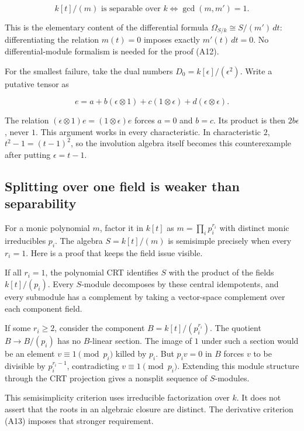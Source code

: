 \documentclass[
  11pt,
]{article}
\begin{document}
\[
\boxed{\ k[t]/(m)\text{ is separable over }k
       \iff \gcd(m,m')=1.\ }                       \tag{A13}
\]

This is the elementary content of the differential formula
\(\Omega_{S/k}\cong S/(m')\,dt\): differentiating the relation
\(m(t)=0\) imposes exactly \(m'(t)\,dt=0\). No differential-module
formalism is needed for the proof (A12).

For the smallest failure, take the dual numbers
\(D_0=k[\epsilon]/(\epsilon^2)\). Write a putative tensor as

\[
e=a+b(\epsilon\otimes1)+c(1\otimes\epsilon)
  +d(\epsilon\otimes\epsilon).
\]

The relation \((\epsilon\otimes1)e=(1\otimes\epsilon)e\) forces \(a=0\)
and \(b=c\). Its product is then \(2b\epsilon\), never \(1\). This
argument works in every characteristic. In characteristic \(2\),
\(t^2-1=(t-1)^2\), so the involution algebra itself becomes this
counterexample after putting \(\epsilon=t-1\).

\subsection{Splitting over one field is weaker than
separability}\label{splitting-over-one-field-is-weaker-than-separability}

For a monic polynomial \(m\), factor it in \(k[t]\) as
\(m=\prod_i p_i^{r_i}\) with distinct monic irreducibles \(p_i\). The
algebra \(S=k[t]/(m)\) is semisimple precisely when every \(r_i=1\).
Here is a proof that keeps the field issue visible.

If all \(r_i=1\), the polynomial CRT identifies \(S\) with the product
of the fields \(k[t]/(p_i)\). Every \(S\)-module decomposes by these
central idempotents, and every submodule has a complement by taking a
vector-space complement over each component field.

If some \(r_i\ge2\), consider the component \(B=k[t]/(p_i^{r_i})\). The
quotient \(B\to B/(p_i)\) has no \(B\)-linear section. The image of
\(1\) under such a section would be an element \(v\equiv1\pmod{p_i}\)
killed by \(p_i\). But \(p_i v=0\) in \(B\) forces \(v\) to be divisible
by \(p_i^{r_i-1}\), contradicting \(v\equiv1\pmod{p_i}\). Extending this
module structure through the CRT projection gives a nonsplit sequence of
\(S\)-modules.

This semisimplicity criterion uses irreducible factorization over \(k\).
It does not assert that the roots in an algebraic closure are distinct.
The derivative criterion (A13) imposes that stronger requirement.
\end{document}
